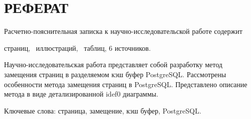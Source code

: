 

 

\setcounter{page}{3}

\chapter*{РЕФЕРАТ}
Расчетно-пояснительная записка к научно-исследовательской работе содержит  \begin{NoHyper}\pageref{LastPage}\end{NoHyper} страниц, \totfig~иллюстраций, \tottab~таблиц, 6 источников.

Научно-исследовательская работа представляет собой разработку метод замещения страниц в разделяемом кэш буфер PostgreSQL. 
Рассмотрены особенности метода замещения страниц в PostgreSQL.
Представлено описание метода в виде детализированной idef0 диаграммы.

Ключевые слова: страница, замещение, кэш буфер, PostgreSQL.